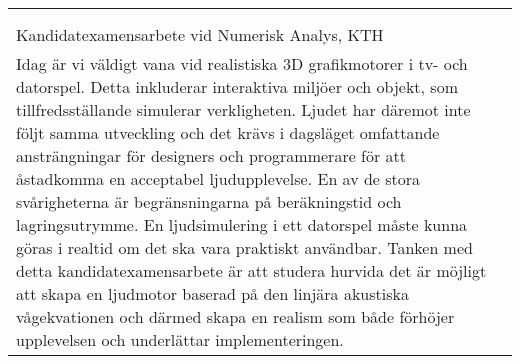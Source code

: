 \documentclass{a0poster}
\begin{document}
\begin{tabular}{ll}

	\begin{minipage}{425mm}

		{\Huge\bf Simulering av ljudvågor med tillämpning inom datorspel}\\[10mm]
		{\Large\bf Alexander Aurell, \;Daniel von Witting,\\[3mm]
		Kandidatexamensarbete vid Numerisk Analys, KTH} \\


		\vspace*{5mm}

Idag är vi väldigt vana vid realistiska 3D grafikmotorer i tv- och datorspel. Detta inkluderar interaktiva miljöer och objekt, som tillfredsställande simulerar verkligheten. Ljudet har däremot inte följt samma utveckling och det krävs i dagsläget omfattande ansträngningar för designers och programmerare för att åstadkomma en acceptabel ljudupplevelse. En av de stora svårigheterna är begränsningarna på beräkningstid och lagringsutrymme. En ljudsimulering i ett datorspel måste kunna göras i realtid om det ska vara praktiskt användbar. Tanken med detta kandidatexamensarbete är att studera hurvida det är möjligt att skapa en ljudmotor baserad på den linjära akustiska vågekvationen och därmed skapa en realism som både förhöjer upplevelsen och underlättar implementeringen.


	\end{minipage}

\end{tabular}

\vspace*{25mm}

\begin{minipage}{\linewidth}

	\begin{multicols*}{2}

		
		
		
		
		
		
		
		

		
		

	\end{multicols*}

\end{minipage}
\end{document}
